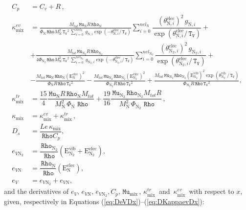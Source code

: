 \documentclass[10pt]{article}
\newcommand{\Rho}{\,\mathtt{Rho}}
\newcommand{\TV}{\,\mathtt{T_V}}
\newcommand{\N}{\text{N}}
\newcommand{\elec}{\text{elec}}
\newcommand{\vib}{\text{vib}}
\newcommand{\E}{\text{E}}
\newcommand{\Mu}{\, \mathtt{Mu}}
\newcommand{\mix}{\text{mix}\,}
\newcommand{\eelecNden}{\,\sum_{i=0}^{nel_{\N}}   \, g_{\N,i}   \exp \left( -\theta^{\elec}_{\N,i} / \TV  \right) }
\newcommand{\eelecNdoisden}{\,\sum_{i=0}^{nel_{\N_2}}  \, g_{\N_2,i}   \exp \left( -\theta^{\elec}_{\N_2,i} /  \TV \right)}
\begin{document}
\begin{equation*}
\begin{split}
C_p &=  C_v+R\,, \\
%
\kappa^{ev}_{\mix} &= \frac{M_{tot} \Mu_{\N} R \Rho_{\N} }{\Phi_{\N} \Rho M_{\N}^{2} \TV^{2} \eelecNden } \sum_{i=0}^{nel_{\N}} \dfrac{ \left( \theta^{\elec}_{\N,i} \right)^2   \, g_{\N,i} }{ \exp \left( \theta^{\elec}_{\N,i} / \TV \right)} +\\
%
  &+ \frac{M_{tot} \Mu_{\N_2} R \Rho_{\N_2} }{4 \Phi_{\N_2} \Rho M_{\N}^{2} \TV^{2} \eelecNdoisden }  \sum_{i=0}^{nel_{\N_2}} \dfrac{ \left( \theta^{\elec}_{\N_2,i} \right)^2   \, g_{\N_2,i} }{ \exp \left( \theta^{\elec}_{\N_2,i} /  \TV \right)} +\\
%
  &- \frac{M_{tot} \Mu_{\N} \Rho_{\N} \left( \E^{\elec}_{\N} \right)^2 }{\Phi_{\N} R \Rho \TV^{2}} - \frac{M_{tot} \Mu_{\N_2} \Rho_{\N_2} \left( \E^{\elec}_{\N_2} \right)^2 }{\Phi_{\N_2} R \Rho \TV^{2}} + \frac{M_{tot} \Mu_{\N_2} \Rho_{\N_2} \left( \E^{\vib}_{\N_2} \right)^2 \exp\left( \theta^{\vib}_{\N_2} \, / \TV \right) }{\Phi_{\N_2} R \Rho \TV^{2}},\\
%
\kappa^{tr}_{\text{mix}} &= \dfrac{15}{4} \dfrac{\Mu_{\N} R \Rho_{\N} M_{tot}}{ \, M_{\N}^2 \, \Phi_{\N}\, \Rho }+\dfrac{19}{16} \dfrac{ \Mu_{\N_2} \Rho_{\N_2} M_{tot} R}{ \, M_{\N}^2 \, \Phi_{\N_2}\, \Rho  }\,, \\ 
\kappa_{\text{mix}}  &= \kappa^{ev}_{\text{mix}}+\kappa^{tr}_{\text{mix}} \,,\\
%
D_s &= \dfrac{Le \, \kappa_{\text{mix}}}{\Rho C_p},	\,\\
%
e_{V\N_2} &= \dfrac{\Rho_{\N_2}}{\Rho} \left( \E_{\N_2}^{\vib}   + \E_{\N_2}^{\elec}  \right),\\
%
e_{V\N} &= \dfrac{\Rho_{\N}}{\Rho} \left(  \E_{\N}^{\elec}  \right),\\
%
e_{V} &= e_{V\N_2}+e_{V\N},
 \end{split}
\end{equation*}
%
and the derivatives of $e_V,\,e_{V \N},\,e_{V \N_2},C_p, \Mu_\mix, \, \kappa^{tr}_\mix$ and $\, \kappa^{ev}_\mix$ with respect to $x$, given, respectively in Equations (\ref{eq:DeVDx})--(\ref{eq:DKappaevDx}):
%
\end{document}
